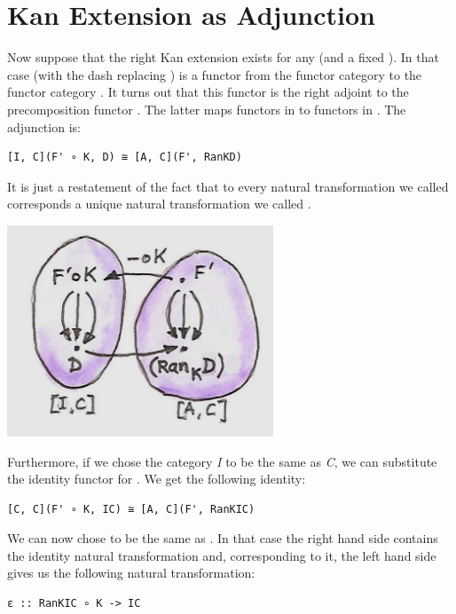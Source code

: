 \section{Kan Extension as
Adjunction}\label{kan-extension-as-adjunction}

Now suppose that the right Kan extension exists for any  (and
a fixed ). In that case  (with the dash
replacing ) is a functor from the functor category
\code{{[}I,\ C{]}} to the functor category \code{{[}A,\ C{]}}. It
turns out that this functor is the right adjoint to the precomposition
functor . The latter maps functors in \code{{[}A,\ C{]}}
to functors in \code{{[}I,\ C{]}}. The adjunction is:

\begin{verbatim}
[I, C](F' ∘ K, D) ≅ [A, C](F', RanKD)
\end{verbatim}

It is just a restatement of the fact that to every natural
transformation we called  corresponds a unique natural
transformation we called .

\includegraphics[width=3.12500in]{images/kan92.jpg}

Furthermore, if we chose the category \emph{I} to be the same as
\emph{C}, we can substitute the identity functor  for
. We get the following identity:

\begin{verbatim}
[C, C](F' ∘ K, IC) ≅ [A, C](F', RanKIC)
\end{verbatim}

We can now chose  to be the same as . In
that case the right hand side contains the identity natural
transformation and, corresponding to it, the left hand side gives us the
following natural transformation:

\begin{verbatim}
ε :: RanKIC ∘ K -> IC
\end{verbatim}

